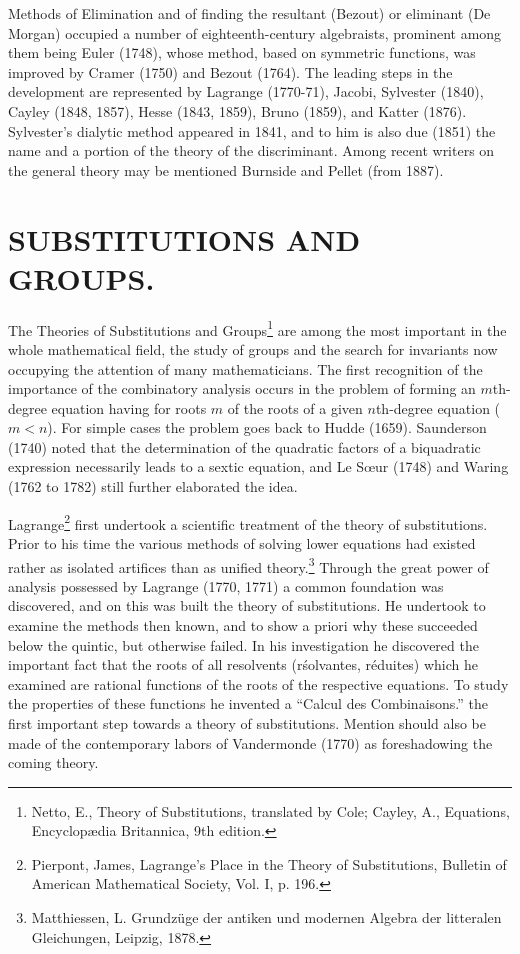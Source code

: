\documentclass[oneside]{book}
\begin{document}
{Methods of Elimination and of finding the resultant (Bezout) or
eliminant (De Morgan) occupied a number of eighteenth-century
algebraists, prominent among them being Euler (1748), whose method,
based on symmetric functions, was improved by Cramer (1750) and
Bezout (1764). The leading steps in the development are represented
by Lagrange (1770-71), Jacobi, Sylvester (1840), Cayley (1848,
1857), Hesse (1843, 1859), Bruno (1859), and Katter
(1876). Sylvester's dialytic method appeared in 1841, and to him is
also due (1851) the name and a portion of the theory of the
discriminant. Among recent writers on the general theory may be
mentioned Burnside and Pellet (from 1887).

\chapter{SUBSTITUTIONS AND GROUPS.}

The Theories of Substitutions and Groups\footnote{Netto, E., Theory
of Substitutions, translated by Cole; Cayley, A., Equations,
Encyclop\ae{}dia Britannica, 9th edition.} are among the most important
in the whole mathematical field, the study of groups and the search
for invariants now occupying the attention of many
mathematicians. The first recognition of the importance of the
combinatory analysis occurs in the problem of forming an
$m$th-degree equation having for roots $m$ of the roots of a given
$n$th-degree equation ($m < n$). For simple cases the problem goes
back to Hudde (1659). Saunderson (1740) noted that the determination
of the quadratic factors of a biquadratic expression necessarily
leads to a sextic equation, and Le S\oe{}ur (1748) and Waring (1762
to 1782) still further elaborated the idea.

Lagrange\footnote{Pierpont, James, Lagrange's Place in the Theory
of Substitutions, Bulletin of American Mathematical Society, Vol. I, p.
196.} first undertook a scientific treatment of the theory of
substitutions. Prior to his time the various methods of solving
lower equations had existed rather as isolated artifices than as
unified theory.\footnote{Matthiessen, L. Grundz\"uge der antiken
und modernen Algebra der litteralen Gleichungen, Leipzig, 1878.}
Through the great power of analysis possessed by Lagrange (1770,
1771) a common foundation was discovered, and on this was built the
theory of substitutions. He undertook to examine the methods then
known, and to show a priori why these succeeded below the quintic,
but otherwise failed. In his investigation he discovered the
important fact that the roots of all resolvents (r\'solvantes,
r\'eduites) which he examined are rational functions of the roots
of the respective equations. To study the properties of these
functions he invented a ``Calcul des Combinaisons.'' the first
important step towards a theory of substitutions. Mention should
also be made of the contemporary labors of Vandermonde (1770) as
foreshadowing the coming theory.

}
\end{document}
